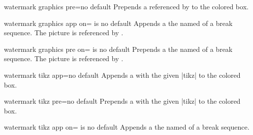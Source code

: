 \begin{docTcbKey}{watermark graphics pre}{=}{no default}
  Prepends a  referenced by  to the colored box.
\end{docTcbKey}

\begin{docTcbKey}{watermark graphics app on}{= is }{no default}
  Appends a  the named  of a break sequence.
  The picture is referenced by .
\end{docTcbKey}


\begin{docTcbKey}{watermark graphics pre on}{= is }{no default}
  Prepends a  the named  of a break sequence.
  The picture is referenced by .
\end{docTcbKey}


\begin{docTcbKey}{watermark tikz app}{=}{no default}
  Appends a  with the  given |tikz|  to the colored box.
\end{docTcbKey}

\begin{docTcbKey}{watermark tikz pre}{=}{no default}
  Prepends a  with the  given |tikz|  to the colored box.

\begin{dispExample}

\begin{tcolorbox}[enhanced,title=My title, watermark text=Watermark,
  smiley]
\lipsum[1-2]
\end{tcolorbox}
\end{dispExample}
\end{docTcbKey}

\enlargethispage*{1cm}

\begin{docTcbKey}{watermark tikz app on}{= is }{no default}
  Appends a  the named  of a break sequence.
\end{docTcbKey}

